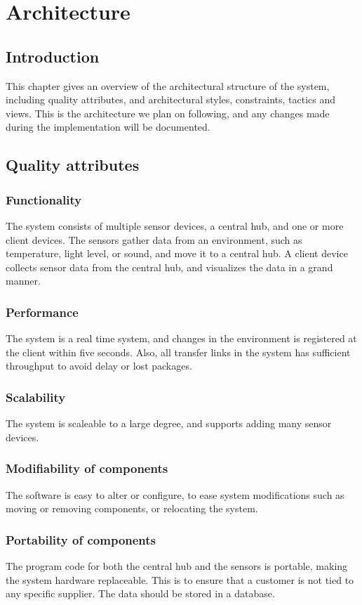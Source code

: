 \documentclass[../document.tex]{subfiles}
\begin{document}
\section{Architecture}
\subsection{Introduction}
This chapter gives an overview of the architectural structure of the system, including quality attributes, and architectural styles, constraints, tactics and views. This is the architecture we plan on following, and any changes made during the implementation will be documented.

\subsection{Quality attributes}
\subsubsection{Functionality}
The system consists of multiple sensor devices, a central hub, and one or more client devices. The sensors gather data from an environment, such as temperature, light level, or sound, and move it to a central hub. A client device collects sensor data from the central hub, and visualizes the data in a grand manner.

\subsubsection{Performance}
The system is a real time system, and changes in the environment is registered at the client within five seconds. Also, all transfer links in the system has sufficient throughput to avoid delay or lost packages.

\subsubsection{Scalability}
The system is scaleable to a large degree, and supports adding many sensor devices.

\subsubsection{Modifiability of components}
The software is easy to alter or configure, to ease system modifications such as moving or removing components, or relocating the system.

\subsubsection{Portability of components}
The program code for both the central hub and the sensors is portable, making the system hardware replaceable. This is to ensure that a customer is not tied to any specific supplier. The data should be stored in a database.
\end{document}
